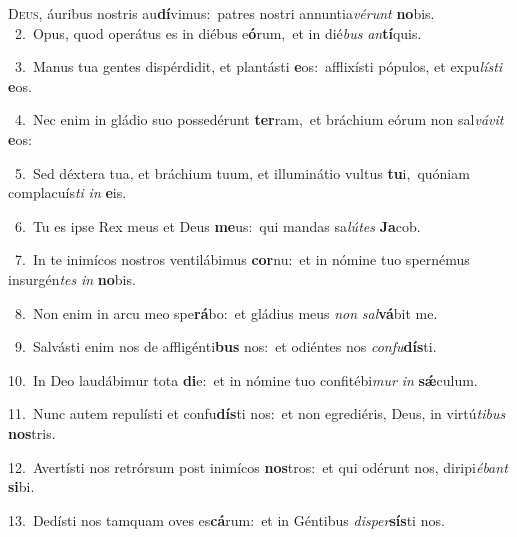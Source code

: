 \lettrine{\initial\textcolor{\initialcolor}{D}}{eus,} áuribus nostris au\-\textbf{dí}\-vimus:~\star patres nostri annuntia\-\textit{vé}\-\textit{runt} \textbf{no}\-bis.\\
{\numbfont\textcolor{\numbcolor}{~2.}}~Opus, quod operátus es in diébus e\-\textbf{ó}\-rum,~\star et in dié\textit{bus} \textit{an}\-\textbf{tí}quis.\par
{\numbfont\textcolor{\numbcolor}{~3.}}~Manus tua gentes dispérdidit, et plantásti \textbf{e}\-os:~\star afflixísti pópulos, et expu\-\textit{lís}\-\textit{ti} \textbf{e}\-os.\par
{\numbfont\textcolor{\numbcolor}{~4.}}~Nec enim in gládio suo possedérunt \textbf{ter}\-ram,~\star et bráchium eórum non sal\-\textit{vá}\-\textit{vit} \textbf{e}\-os:\par
{\numbfont\textcolor{\numbcolor}{~5.}}~Sed déxtera tua, et bráchium tuum, et illuminátio vultus \textbf{tu}\-i,~\star quóniam complacuís\textit{ti} \textit{in} \textbf{e}\-is.\par
{\numbfont\textcolor{\numbcolor}{~6.}}~Tu es ipse Rex meus et Deus \textbf{me}\-us:~\star qui mandas sa\-\textit{lú}\-\textit{tes} \textbf{Ja}\-cob.\par
{\numbfont\textcolor{\numbcolor}{~7.}}~In te inimícos nostros ventilábimus \textbf{cor}\-nu:~\star et in nómine tuo spernémus insurgén\textit{tes} \textit{in} \textbf{no}\-bis.\par
{\numbfont\textcolor{\numbcolor}{~8.}}~Non enim in arcu meo spe\-\textbf{rá}\-bo:~\star et gládius meus \textit{non} \textit{sal}\-\textbf{vá}bit me.\par
{\numbfont\textcolor{\numbcolor}{~9.}}~Salvásti enim nos de affligénti\textbf{bus} nos:~\star et odiéntes nos \textit{con}\-\textit{fu}\textbf{dís}ti.\par
{\numbfont\textcolor{\numbcolor}{10.}}~In Deo laudábimur tota \textbf{di}\-e:~\star et in nómine tuo confitébi\textit{mur} \textit{in} \textbf{sǽ}\-culum.\par
{\numbfont\textcolor{\numbcolor}{11.}}~Nunc autem repulísti et confu\-\textbf{dís}\-ti nos:~\star et non egrediéris, Deus, in virtú\-\textit{ti}\-\textit{bus} \textbf{nos}\-tris.\par
{\numbfont\textcolor{\numbcolor}{12.}}~Avertísti nos retrórsum post inimícos \textbf{nos}\-tros:~\star et qui odérunt nos, diripi\-\textit{é}\-\textit{bant} \textbf{si}\-bi.\par
{\numbfont\textcolor{\numbcolor}{13.}}~Dedísti nos tamquam oves es\-\textbf{cá}\-rum:~\star et in Géntibus \textit{di}\-\textit{sper}\textbf{sís}ti nos.\par
